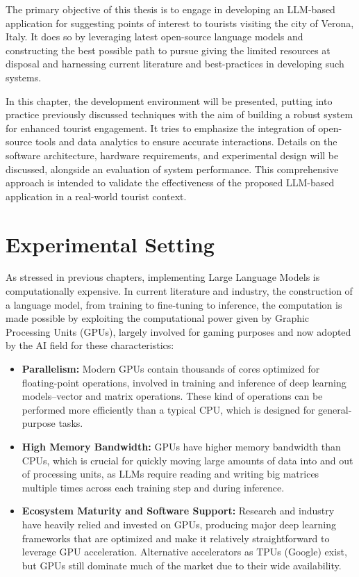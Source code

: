 The primary objective of this thesis is to engage in developing an LLM-based application for suggesting points of interest to tourists visiting the city of Verona, Italy. It does so by leveraging latest open-source language models and constructing the best possible path to pursue giving the limited resources at disposal and harnessing current literature and best-practices in developing such systems.

In this chapter, the development environment will be presented, putting into practice previously discussed techniques with the aim of building a robust system for enhanced tourist engagement. It tries to emphasize the integration of open-source tools and data analytics to ensure accurate interactions. Details on the software architecture, hardware requirements, and experimental design will be discussed, alongside an evaluation of system performance. This comprehensive approach is intended to validate the effectiveness of the proposed LLM-based application in a real-world tourist context.


\section{Experimental Setting}
\label{sec:experimental-setting}

As stressed in previous chapters, implementing Large Language Models is computationally expensive. In current literature and industry, the construction of a language model, from training to fine-tuning to inference, the computation is made possible by exploiting the computational power given by Graphic Processing Units (GPUs), largely involved for gaming purposes and now adopted by the AI field for these characteristics: \cite{gyawali2023gpu}

\begin{itemize}
    \item \textbf{Parallelism:} Modern GPUs contain thousands of cores optimized for floating-point operations, involved in training and inference of deep learning models--vector and matrix operations. These kind of operations can be performed more efficiently than a typical CPU, which is designed for general-purpose tasks.
    \item \textbf{High Memory Bandwidth:} GPUs have higher memory bandwidth than CPUs, which is crucial for quickly moving large amounts of data into and out of processing units, as LLMs require reading and writing big matrices multiple times across each training step and during inference.
    \item \textbf{Ecosystem Maturity and Software Support:} Research and industry have heavily relied and invested on GPUs, producing major deep learning frameworks that are optimized and make it relatively straightforward to leverage GPU acceleration. Alternative accelerators as TPUs (Google) exist, but GPUs still dominate much of the market due to their wide availability.
\end{itemize}

